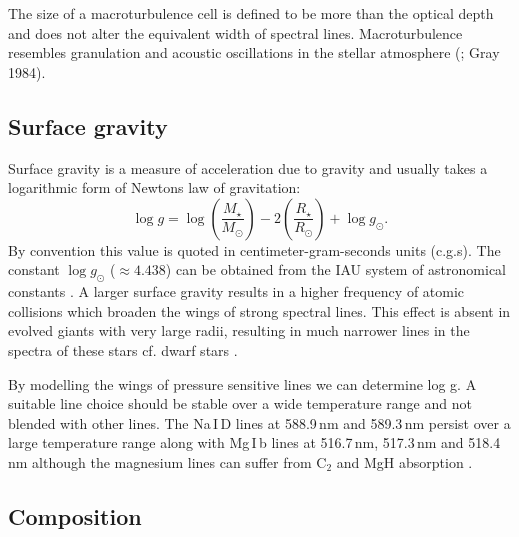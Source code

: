 The size of a macroturbulence cell is defined to be more than the optical depth and does not alter the equivalent width of spectral lines. Macroturbulence resembles granulation and acoustic oscillations in the stellar atmosphere (\citealt{Bruntt2010}; Gray 1984).

\subsection{Surface gravity}

Surface gravity is a measure of acceleration due to gravity and usually takes a logarithmic form of Newtons law of gravitation:
%
\begin{equation}
    \log g = \log \left( \frac{M_\star}{M_\odot} \right) - 2 \left( \frac{R_\star}{R_\odot} \right) + \log g_\odot.
\end{equation}
%
By convention this value is quoted in centimeter-gram-seconds units (c.g.s). The constant $\log g_\odot$ ($\approx 4.438$) can be obtained from the IAU system of astronomical constants \citep{2016AJ....152...41P}.  A larger surface gravity results in a higher frequency of atomic collisions which broaden the wings of strong spectral lines. This effect is absent in evolved giants with very large radii, resulting in much narrower lines in the spectra of these stars cf. dwarf stars \citep{2005MSAIS...8..130S}.

By modelling the wings of pressure sensitive lines we can determine log g. A suitable line choice should be stable over a wide temperature range and not blended with other lines. The Na\,I\,D lines at 588.9\,nm and 589.3\,nm persist over a large temperature range along with Mg\,I\,b lines at 516.7\,nm, 517.3\,nm and 518.4\,nm although the magnesium lines can suffer from C$_2$ and MgH absorption \citep{Doyle2015}.

\subsection{Composition}

